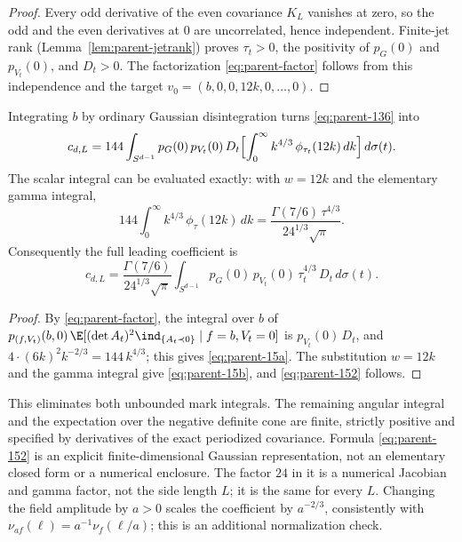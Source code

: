 \begin{proof}
Every odd derivative of the even covariance $K_L$ vanishes at zero, so the odd and the even derivatives at $0$ are uncorrelated, hence independent. Finite-jet rank (Lemma~\ref{lem:parent-jetrank}) proves $\tau_t>0$, the positivity of $p_G(0)$ and $p_{V_t}(0)$, and $D_t>0$. The factorization \eqref{eq:parent-factor} follows from this independence and the target $v_0=(b,0,0,12k,0,\dots,0)$.
\end{proof}

\begin{proposition}\label{prop:parent-coef}
Integrating $b$ by ordinary Gaussian disintegration turns \eqref{eq:parent-136} into
\begin{equation}\label{eq:parent-15a}
c_{d,L}=144\int_{S^{d-1}}p_G(0)\,p_{V_t}(0)\,D_t\Bigl[\int_0^\infty k^{4/3}\,\phi_{\tau_t}(12k)\,dk\Bigr]\,d\sigma(t).
\end{equation}
The scalar integral can be evaluated exactly: with $w=12k$ and the elementary gamma integral,
\begin{equation}\label{eq:parent-15b}
144\int_0^\infty k^{4/3}\,\phi_\tau(12k)\,dk=\frac{\Gamma(7/6)\,\tau^{4/3}}{24^{1/3}\sqrt\pi}.
\end{equation}
Consequently the full leading coefficient is
\begin{equation}\label{eq:parent-152}
c_{d,L}=\frac{\Gamma(7/6)}{24^{1/3}\sqrt\pi}\int_{S^{d-1}}p_G(0)\,p_{V_t}(0)\,\tau_t^{4/3}\,D_t\,d\sigma(t).
\end{equation}
\end{proposition}

\begin{proof}
By \eqref{eq:parent-factor}, the integral over $b$ of $p_{(f,V_t)}(b,0)\,\E[(\det A_t)^2\ind_{\{A_t\prec0\}}\mid f=b,V_t=0]$ is $p_{V_t}(0)\,D_t$, and $4\cdot(6k)^2k^{-2/3}=144\,k^{4/3}$; this gives \eqref{eq:parent-15a}. The substitution $w=12k$ and the gamma integral give \eqref{eq:parent-15b}, and \eqref{eq:parent-152} follows.
\end{proof}

This eliminates both unbounded mark integrals. The remaining angular integral and the expectation over the negative definite cone are finite, strictly positive and specified by derivatives of the exact periodized covariance. Formula \eqref{eq:parent-152} is an explicit finite-dimensional Gaussian representation, not an elementary closed form or a numerical enclosure. The factor $24$ in it is a numerical Jacobian and gamma factor, not the side length $L$; it is the same for every $L$. Changing the field amplitude by $a>0$ scales the coefficient by $a^{-2/3}$, consistently with $\nu_{af}(\ell)=a^{-1}\nu_f(\ell/a)$; this is an additional normalization check.


